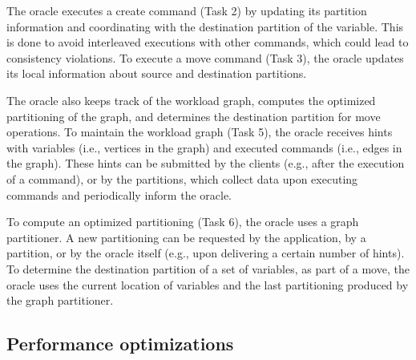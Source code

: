The oracle executes a create command (Task 2) by updating its partition information and coordinating with the destination partition of the variable.
This is done to avoid interleaved executions with other commands, which could lead to consistency violations. 
To execute a move command (Task 3), the oracle updates its local information about source and destination partitions.

The oracle also keeps track of the workload graph, computes the optimized partitioning of the graph, and determines the destination partition for move operations. %
To maintain the workload graph (Task 5), the oracle receives hints with variables (i.e., vertices in the graph) and executed commands (i.e., edges in the graph).
These hints can be submitted by the clients (e.g., after the execution of a command), or by the partitions, which collect data upon executing commands and periodically inform the oracle.

To compute an optimized partitioning (Task 6), the oracle uses a graph partitioner.
A new partitioning can be requested by the application, by a partition, or by the oracle itself (e.g., upon delivering a certain number of hints).
To determine the destination partition of a set of variables, as part of a move, the oracle uses the current location of variables and the last partitioning produced by the graph partitioner.


\subsection{Performance optimizations}
\label{sec:optm}

